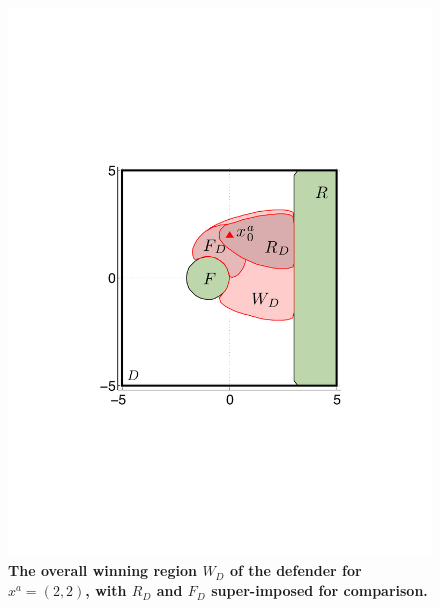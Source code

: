 \documentclass[letterpaper, 10 pt, conference]{ieeeconf}  %
\numberwithin{algorithm}{section}
\begin{document}
\begin{figure}[tb]
	\centering
	\includegraphics[width=0.6\columnwidth]{figures/FCFR45.pdf}
	\caption{\textbf{The overall winning region $W_D$ of the defender for $x^a = (2,2)$, with $R_D$ and $F_D$ super-imposed for comparison.}}
	\label{fig:defenderWinSet}
\end{figure}
\setlength\tabcolsep{0.5pt}
\end{document}
